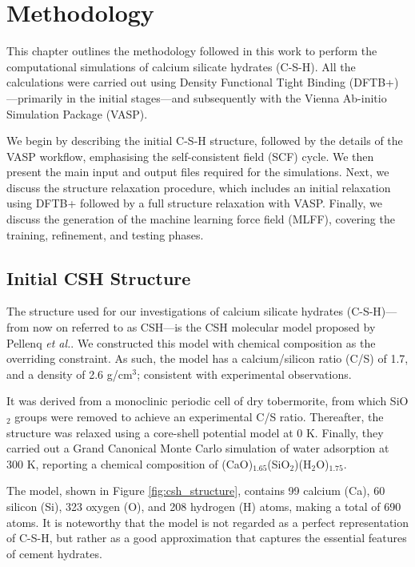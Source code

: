 \chapter{Methodology}
\label{Chapeter3}
This chapter outlines the methodology followed in this work to perform the computational simulations of calcium silicate hydrates (C-S-H). All the calculations were carried out using Density Functional Tight Binding (DFTB+)---primarily in the initial stages---and subsequently with the Vienna Ab-initio Simulation Package (VASP).

We begin by describing the initial C-S-H structure, followed by the 
details of the VASP workflow, emphasising the self-consistent field (SCF) cycle. We then present the main input and output files required for the simulations. Next, we discuss the structure relaxation procedure, which includes an initial relaxation using DFTB+ followed by a full structure relaxation with VASP. Finally, we discuss the generation of the machine learning force field (MLFF), covering the training, refinement, and testing phases. 

\section{Initial CSH Structure}
The structure used for our investigations of calcium silicate hydrates (C-S-H)---from now on referred to as CSH---is the CSH molecular model proposed by Pellenq \emph{et al.}\supercite{Pellenq2009}. We constructed this model with chemical composition as the overriding constraint. As such, the model has a calcium/silicon ratio (C/S) of 1.7, and a density of 2.6 g/cm$^3$; consistent with experimental observations. 

It was derived from a monoclinic periodic cell of dry tobermorite, from which SiO$_2$ groups were removed to achieve an experimental C/S ratio. Thereafter, the structure was relaxed using a core-shell potential model at 0 K. Finally, they carried out a Grand Canonical Monte Carlo simulation of water adsorption at 300 K, reporting a chemical composition of (CaO)$_{1.65}$(SiO$_2$)(H$_2$O)$_{1.75}$. 

The model, shown in Figure \ref{fig:csh_structure}, contains
99 calcium (Ca), 60 silicon (Si), 323 oxygen (O), and 208 hydrogen (H) atoms, making a total of 690 atoms. It is noteworthy that the model is not regarded as a perfect representation of C-S-H, but rather as a good approximation that captures the essential features of cement hydrates.

